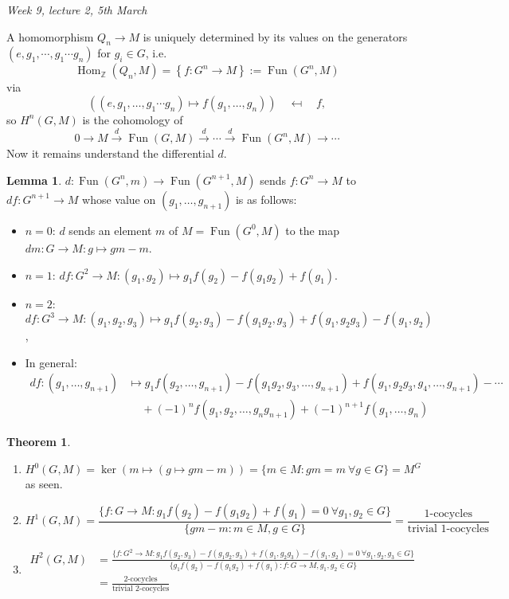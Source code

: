 \documentclass{article}
\newcommand{\Z}{\mathbb{Z}}
\newcommand{\Fun}{\operatorname{Fun}}
\newcommand{\Hom}{\operatorname{Hom}}
\theoremstyle{definition}
\newtheorem{thm}[defn]{Theorem}
\newtheorem{lemma}[defn]{Lemma}
\begin{document}
\begin{flushright}
\textit{Week 9, lecture 2, 5th March}
\end{flushright}

A homomorphism $Q_n\rightarrow M$ is uniquely determined by its values on the generators $(e,g_1,\cdots,g_1\cdots g_n)$ for $g_i\in G$, i.e.
\[
\Hom_\Z(Q_n,M)=\left\{f:G^n\rightarrow M\right\}:=\Fun(G^n,M)
\]
via
\[
((e,g_1,\ldots,g_1\cdots g_n) \mapsto f(g_1,\ldots,g_n)) \quad \mapsfrom \quad f,
\]
so $H^n(G,M)$ is the cohomology of
\[
0\rightarrow M\xrightarrow{d}\Fun(G,M)\xrightarrow{d}\cdots\xrightarrow{d}\Fun(G^n,M)\rightarrow\cdots
\]
Now it remains understand the differential $d$.
\begin{lemma}
$d:\Fun(G^n,m)\rightarrow \Fun(G^{n+1},M)$ sends $f:G^n\rightarrow M$ to $df:G^{n+1}\rightarrow M$ whose value on $(g_1,\ldots,g_{n+1})$ is as follows:
\begin{itemize}
\item $n=0$: $d$ sends an element $m$ of $M=\Fun(G^0,M)$ to the map $dm:G\rightarrow M:g\mapsto gm-m$.
\item $n=1$: $df:G^2\rightarrow M:(g_1,g_2)\mapsto g_1f(g_2)-f(g_1g_2)+f(g_1)$.
\item $n=2$: $df:G^3\rightarrow M:(g_1,g_2,g_3)\mapsto g_1f(g_2,g_3)-f(g_1g_2,g_3)+f(g_1,g_2g_3)-f(g_1,g_2)$,
\item In general:
\[
\begin{aligned}
df:(g_1,\ldots,g_{n+1})&\mapsto g_1f(g_2,\ldots,g_{n+1})-f(g_1g_2,g_3,\ldots,g_{n+1})+f(g_1,g_2g_3,g_4,\ldots,g_{n+1})-\cdots\\
&\quad \ +(-1)^nf(g_1,g_2,\ldots,g_ng_{n+1})+(-1)^{n+1}f(g_1,\ldots,g_n)
\end{aligned}
\]
\end{itemize}
\end{lemma}

\begin{thm}
\begin{enumerate}
\item $H^0(G,M)=\ker(m\mapsto (g\mapsto gm-m))=\{m\in M:gm=m \ \forall g\in G\}=M^G$ as seen.
\item
\[
H^1(G,M)=\frac{\{f:G\rightarrow M:g_1f(g_2)-f(g_1g_2)+f(g_1)=0 \ \forall g_1,g_2\in G\}}{\{gm-m:m\in M,g\in G\}}=\frac{\text{1-cocycles}}{\text{trivial 1-cocycles}}
\]
\item \[
\begin{aligned}
H^2(G,M)&=\frac{\{f:G^2\rightarrow M:g_1f(g_2,g_3)-f(g_1g_2,g_3)+f(g_1,g_2g_3)-f(g_1,g_2)=0 \ \forall g_1,g_2,g_3\in G\}}{\{g_1f(g_2)-f(g_1g_2)+f(g_1): f:G\rightarrow M,g_1,g_2\in G\}}\\&=\frac{\text{2-cocycles}}{\text{trivial 2-cocycles}}
\end{aligned}
\]
\end{enumerate}
\end{thm}
\end{document}
